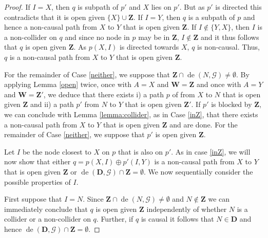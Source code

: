 \documentclass[11pt,a4paper]{article}
\theoremstyle{definition}
\theoremstyle{remark}
\DeclareMathOperator{\de}{de}
\newcommand{\g}[1][G]{\mathcal{#1}}
\begin{document}
\begin{proof}
	If $I=X$, then $q$ is subpath of $p'$ and $X$ lies on $p'$. But as $p'$ is directed this contradicts that it is open given $\{X\} \cup \mathbf{Z}$. If $I=Y$, then $q$ is a subpath of $p$ and hence a non-causal path from $X$ to $Y$ that is open given $\mathbf{Z}$. If $I \notin \{Y,X\}$, then $I$ is a non-collider on $q$ and since no node in $p$ may be in $\mathbf{Z}$, $I \notin \mathbf{Z}$ and it thus follows that $q$ is open given $\mathbf{Z}$. As $p(X,I)$ is directed towards $X$, $q$ is non-causal. Thus, $q$ is a non-causal path from $X$ to $Y$ that is open given $\mathbf{Z}$.
	
	
	For the remainder of Case \ref{neither}, we suppose that $\mathbf{Z} \cap \de(N,\g) \neq \emptyset$. By applying Lemma \ref{open} twice, once with $A=X$ and $\mathbf{W}=\mathbf{Z}$ and once with $A=Y$ and $\mathbf{W}=\mathbf{Z'}$, we deduce that there exists i) a path $p$ of from $X$ to $N$ that is open given $\mathbf{Z}$ and ii) a path $p'$ from $N$ to $ Y$ that is open given $\mathbf{Z'}$. 
	If $p'$ is blocked by $\mathbf{Z}$, we can conclude with Lemma \ref{lemma:collider}, as in Case \ref{inZ}, that there exists a non-causal path from $X$ to $Y$ that is open given $\mathbf{Z}$ and are done. For the remainder of Case \ref{neither}, we suppose that $p'$ is open given $\mathbf{Z}$.
	

Let $I$ be the node closest to $X$ on $p$ that is also on $p'$. As in case \ref{inZ}, we will now show that either $q=p(X,I) \oplus p'(I,Y)$ is a non-causal path from $X$ to $Y$ that is open given $\mathbf{Z}$ or $\de(\mathbf{D},\g) \cap \mathbf{Z} =\emptyset$. We now sequentially consider the possible properties of $I$.
	
	First suppose that $I=N$. Since $\mathbf{Z} \cap \de(N,\g) \neq \emptyset$ and $N \notin \mathbf{Z}$ we can immediately conclude that $q$ is open given $\mathbf{Z}$ independently of whether $N$ is a collider or a non-collider on $q$. Further, if $q$ is causal it follows that $N \in \mathbf{D}$ and hence $\de(\mathbf{D},\g) \cap \mathbf{Z} = \emptyset$. 
	

\end{proof}
\end{document}
